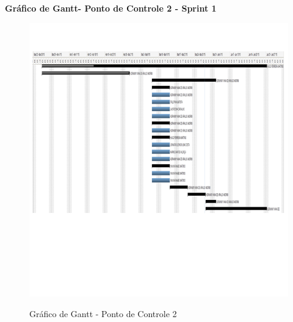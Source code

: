   \pagebreak
  \textbf{Gráfico de Gantt- Ponto de Controle 2 - Sprint 1}
   \begin{figure}[!h]
    \centering
    \includegraphics[scale = 1]{editaveis/figuras/ganttPC2}
    \label{Gráfico de Gantt PC2}
    \caption{Gráfico de Gantt - Ponto de Controle 2}
   \end{figure}
   \FloatBarrier
   
